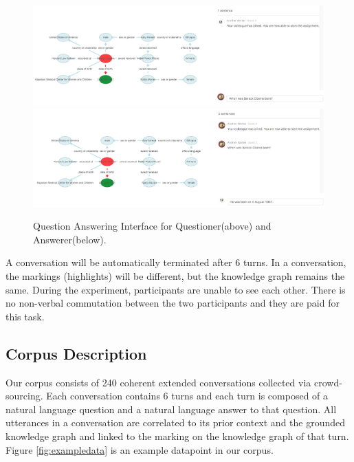 \documentclass[bsc,frontabs,twoside,singlespacing,parskip,deptreport]{infthesis}     %
\begin{document}
\begin{figure}[h]
    \centering
    \includegraphics[width=1\textwidth]{q1.png}
    \includegraphics[width=1\textwidth]{a1.png}
    \caption{Question Answering Interface for Questioner(above) and Answerer(below).}
    \label{fig:kgjson}
\end{figure}



A conversation will be automatically terminated after 6 turns. In a conversation, the markings (highlights) will be different, but the knowledge graph remains the same. During the experiment, participants are unable to see each other. There is no non-verbal commutation between the two participants and they are paid for this task.

\subsection{Corpus Description}

Our corpus consists of 240 coherent extended conversations collected via crowd-sourcing. Each conversation contains 6 turns and each turn is composed of a natural language question and a natural language answer to that question. All utterances in a conversation are correlated to its prior context and the grounded knowledge graph and linked to the marking on the knowledge graph of that turn. Figure \ref{fig:exampledata} is an example datapoint in our corpus.
\end{document}
